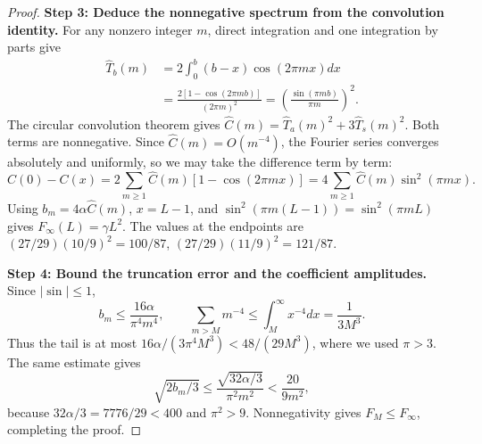 \documentclass[a4paper,11pt]{article}
\theoremstyle{remark}
\begin{document}
\begin{proof}
\textbf{Step 3: Deduce the nonnegative spectrum from the convolution identity.}
For any nonzero integer $m$, direct integration and one integration by parts give
\begin{align*}
 \widehat T_b(m)&=2\int_0^b(b-x)\cos(2\pi mx)dx\\
 &=\frac{2[1-\cos(2\pi mb)]}{(2\pi m)^2}
 =\left(\frac{\sin(\pi mb)}{\pi m}\right)^2.
\end{align*}
The circular convolution theorem gives
$\widehat C(m)=\widehat T_a(m)^2+3\widehat T_s(m)^2$.
Both terms are nonnegative. Since $\widehat C(m)=O(m^{-4})$, the Fourier series converges absolutely and uniformly,
so we may take the difference term by term:
\[
 C(0)-C(x)=2\sum_{m\ge1}\widehat C(m)[1-\cos(2\pi mx)]
 =4\sum_{m\ge1}\widehat C(m)\sin^2(\pi mx).
\]
Using $b_m=4\alpha\widehat C(m)$, $x=L-1$, and
$\sin^2(\pi m(L-1))=\sin^2(\pi mL)$ gives $F_\infty(L)=\gamma L^2$.
The values at the endpoints are
$(27/29)(10/9)^2=100/87$, $(27/29)(11/9)^2=121/87$.

\textbf{Step 4: Bound the truncation error and the coefficient amplitudes.}
Since $|\sin|\le1$,
\[
 b_m\le\frac{16\alpha}{\pi^4m^4},\qquad
 \sum_{m>M}m^{-4}\le\int_M^\infty x^{-4}dx=\frac1{3M^3}.
\]
Thus the tail is at most $16\alpha/(3\pi^4M^3)<48/(29M^3)$, where we used $\pi>3$.
The same estimate gives
\[
 \sqrt{2b_m/3}\le\frac{\sqrt{32\alpha/3}}{\pi^2m^2}
 <\frac{20}{9m^2},
\]
because $32\alpha/3=7776/29<400$ and $\pi^2>9$.
Nonnegativity gives $F_M\le F_\infty$, completing the proof.
\end{proof}
\end{document}
